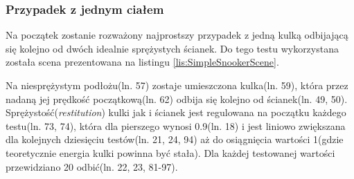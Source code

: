 \documentclass[12pt]{article}
\begin{document}
\subsubsection{Przypadek z jednym ciałem}
Na początek zostanie rozważony najprostszy przypadek z jedną kulką odbijającą
się kolejno od dwóch idealnie sprężystych ścianek. Do tego testu wykorzystana
została scena prezentowana na listingu \ref{lis:SimpleSnookerScene}.
 
Na niesprężystym podłożu(ln. 57) zostaje umieszczona kulka(ln. 59), która przez
nadaną jej prędkość początkową(ln. 62) odbija się kolejno od ścianek(ln. 49,
50). Sprężystość(\emph{restitution}) kulki jak i ścianek jest regulowana na
początku każdego testu(ln. 73, 74), która dla pierszego wynosi 0.9(ln. 18) i
jest liniowo zwiększana dla kolejnych dziesięciu testów(ln. 21, 24, 94) aż do
osiągnięcia wartości 1(gdzie teoretycznie energia kulki powinna być stała).
Dla każdej testowanej wartości przewidziano 20 odbić(ln. 22, 23, 81-97).
  
\end{document}
